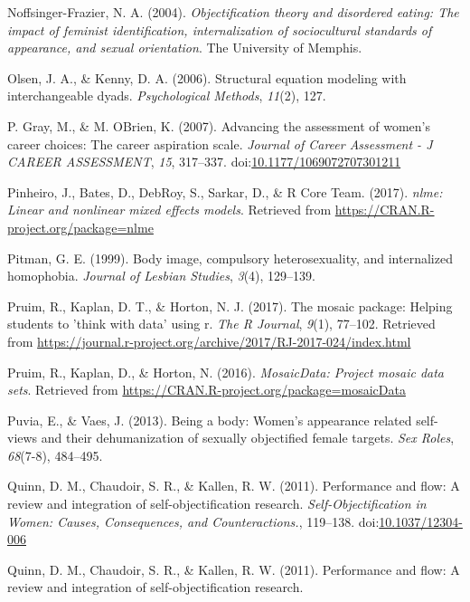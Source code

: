 \documentclass[
  man]{apa6}
\begin{document}
\hypertarget{ref-noffsinger2004objectification}{}
Noffsinger-Frazier, N. A. (2004). \emph{Objectification theory and
disordered eating: The impact of feminist identification,
internalization of sociocultural standards of appearance, and sexual
orientation}. The University of Memphis.

\hypertarget{ref-olsen2006structural}{}
Olsen, J. A., \& Kenny, D. A. (2006). Structural equation modeling with
interchangeable dyads. \emph{Psychological Methods}, \emph{11}(2), 127.

\hypertarget{ref-grayobrien2007}{}
P. Gray, M., \& M. OBrien, K. (2007). Advancing the assessment of
women's career choices: The career aspiration scale. \emph{Journal of
Career Assessment - J CAREER ASSESSMENT}, \emph{15}, 317--337.
doi:\href{https://doi.org/10.1177/1069072707301211}{10.1177/1069072707301211}

\hypertarget{ref-R-nlme}{}
Pinheiro, J., Bates, D., DebRoy, S., Sarkar, D., \& R Core Team. (2017).
\emph{nlme: Linear and nonlinear mixed effects models}. Retrieved from
\url{https://CRAN.R-project.org/package=nlme}

\hypertarget{ref-pitman1999body}{}
Pitman, G. E. (1999). Body image, compulsory heterosexuality, and
internalized homophobia. \emph{Journal of Lesbian Studies}, \emph{3}(4),
129--139.

\hypertarget{ref-R-mosaic}{}
Pruim, R., Kaplan, D. T., \& Horton, N. J. (2017). The mosaic package:
Helping students to 'think with data' using r. \emph{The R Journal},
\emph{9}(1), 77--102. Retrieved from
\url{https://journal.r-project.org/archive/2017/RJ-2017-024/index.html}

\hypertarget{ref-R-mosaicData}{}
Pruim, R., Kaplan, D., \& Horton, N. (2016). \emph{MosaicData: Project
mosaic data sets}. Retrieved from
\url{https://CRAN.R-project.org/package=mosaicData}

\hypertarget{ref-puvia2013being}{}
Puvia, E., \& Vaes, J. (2013). Being a body: Women's appearance related
self-views and their dehumanization of sexually objectified female
targets. \emph{Sex Roles}, \emph{68}(7-8), 484--495.

\hypertarget{ref-quinnetal}{}
Quinn, D. M., Chaudoir, S. R., \& Kallen, R. W. (2011). Performance and
flow: A review and integration of self-objectification research.
\emph{Self-Objectification in Women: Causes, Consequences, and
Counteractions.}, 119--138.
doi:\href{https://doi.org/10.1037/12304-006}{10.1037/12304-006}

\hypertarget{ref-quinn2011performance}{}
Quinn, D. M., Chaudoir, S. R., \& Kallen, R. W. (2011). Performance and
flow: A review and integration of self-objectification research.
\end{document}
